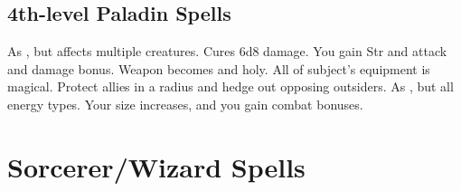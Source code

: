 \subsection{4th-level Paladin Spells}
\begin{spelllist}
   As , but affects multiple creatures.
   Cures 6d8 damage.
   You gain  Str and attack and damage bonus.
   Weapon becomes  and holy.
   All of subject's equipment is magical.
   Protect allies in a \areamed radius and hedge out opposing outsiders.
   As , but all energy types. 
   Your size increases, and you gain combat bonuses.
\end{spelllist}

\section{Sorcerer/Wizard Spells}\label{Sorcerer/Wizard Spells}
